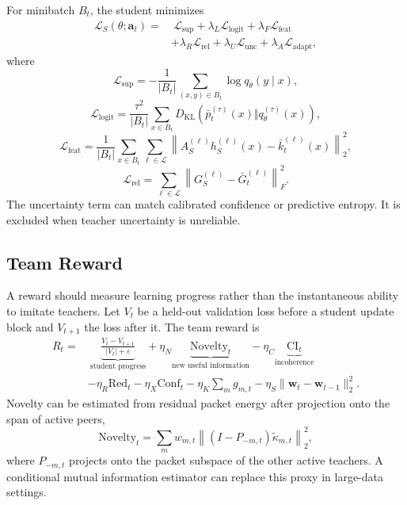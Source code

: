 \documentclass[10pt,twocolumn,a4paper]{article}
\newcommand{\KL}{D_{\mathrm{KL}}}
\newcommand{\cL}{\mathcal{L}}
\begin{document}
For minibatch \(B_t\), the student minimizes
\begin{align}
 \cL_S(\theta;\bm a_t)
 =&\ \cL_{\mathrm{sup}}
 +\lambda_L\cL_{\mathrm{logit}}
 +\lambda_F\cL_{\mathrm{feat}}\nonumber\\
 &+\lambda_R\cL_{\mathrm{rel}}
 +\lambda_U\cL_{\mathrm{unc}}
 +\lambda_A\cL_{\mathrm{adapt}},
\label{eq:studenttotal}
\end{align}
where
\begin{equation}
 \cL_{\mathrm{sup}}=-\frac{1}{|B_t|}\sum_{(x,y)\in B_t}\log q_\theta(y\mid x),
\label{eq:supervised}
\end{equation}
\begin{equation}
 \cL_{\mathrm{logit}}
 =\frac{\tau^2}{|B_t|}\sum_{x\in B_t}
 \KL\left(\bar p_t^{(\tau)}(x)\Vert q_\theta^{(\tau)}(x)\right),
\label{eq:logitloss}
\end{equation}
\begin{equation}
 \cL_{\mathrm{feat}}
 =\frac{1}{|B_t|}\sum_{x\in B_t}\sum_{\ell\in\cL}
 \left\|A_S^{(\ell)}h_S^{(\ell)}(x)-\bar k_t^{(\ell)}(x)\right\|_2^2,
\label{eq:featureloss}
\end{equation}
\begin{equation}
 \cL_{\mathrm{rel}}
 =\sum_{\ell\in\cL}\left\|G_S^{(\ell)}-\bar G_t^{(\ell)}\right\|_F^2.
\label{eq:relationloss}
\end{equation}
The uncertainty term can match calibrated confidence or predictive entropy. It is excluded when teacher uncertainty is unreliable.

\subsection{Team Reward}

A reward should measure learning progress rather than the instantaneous ability to imitate teachers. Let \(V_t\) be a held-out validation loss before a student update block and \(V_{t+1}\) the loss after it. The team reward is
\begin{align}
 R_t
 =&\ \underbrace{\frac{V_t-V_{t+1}}{|V_t|+\varepsilon}}_{\text{student progress}}
 +\eta_N\underbrace{\mathrm{Novelty}_t}_{\text{new useful information}}
 -\eta_C\underbrace{\mathrm{CI}_t}_{\text{incoherence}}\nonumber\\
 &-\eta_R\mathrm{Red}_t
 -\eta_X\mathrm{Conf}_t
 -\eta_K\sum_m g_{m,t}
 -\eta_S\|\bm w_t-\bm w_{t-1}\|_2^2.
\label{eq:reward}
\end{align}
Novelty can be estimated from residual packet energy after projection onto the span of active peers,
\begin{equation}
 \mathrm{Novelty}_t
 =\sum_m w_{m,t}\left\|(I-P_{-m,t})\tilde\kappa_{m,t}\right\|_2^2,
\label{eq:novelty}
\end{equation}
where \(P_{-m,t}\) projects onto the packet subspace of the other active teachers. A conditional mutual information estimator can replace this proxy in large-data settings.
\end{document}
